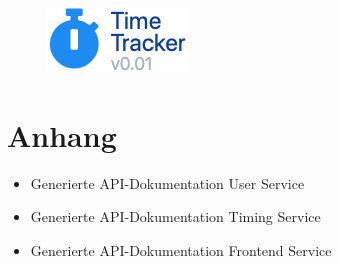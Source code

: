 \documentclass[12pt]{article} %
\begin{document}
\tableofcontents %


\begin{figure}[!b]
	\centering
	\includegraphics[scale=1]{logo_TimeTracker.png}
\end{figure}

\newpage %







\section{Anhang}
\begin{itemize}
	\item Generierte API-Dokumentation User Service 
	\item Generierte API-Dokumentation Timing Service 
	\item Generierte API-Dokumentation Frontend Service 
\end{itemize}

\end{document}
